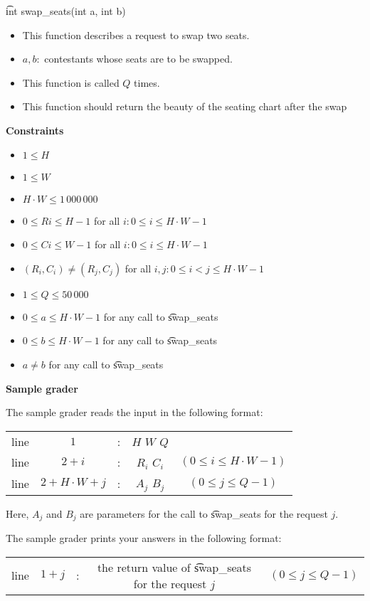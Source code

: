 \t{int swap_seats(int a, int b) }

\begin{itemize}
\item This function describes a request to swap two seats. 
\item $ a, b: $ contestants whose seats are to be swapped.
\item This function is called $ Q $ times.
\item This function should return the beauty of the seating chart after the swap 
\end{itemize}

\bf{Constraints}

\begin{itemize}
\item $ 1 \le H $ 
\item $ 1 \le W $ 
\item $ H \cdot W \le 1\,000\,000 $ 
\item $ 0 \le Ri \le H-1 $ for all $ i: 0 \le i \le H \cdot W-1 $ 
\item $ 0 \le Ci \le W-1 $ for all $ i: 0 \le i \le H \cdot W-1 $ 
\item $ (R_i, C_i) \neq (R_j, C_j) $ for all $ i, j: 0 \le i < j \le H \cdot W-1 $ 
\item $ 1 \le Q \le 50\,000 $ 
\item $ 0 \le a \le H \cdot W -1 $ for any call to \t{swap_seats}
\item $ 0 \le b \le H \cdot W -1 $ for any call to \t{swap_seats}
\item $ a \neq b $ for any call to \t{swap_seats}
\end{itemize} 

\bf{Sample grader}

The sample grader reads the input in the following format:

\begin{tabular}{ccccc}\\
line& $ 1 $ &:& $ H$ $W$ $Q$ &\\
line& $ 2+i $ &:& $R_i$ $C_i$ & $ (0 \le i \le H \cdot W-1) $ \\
line& $ 2+H \cdot W+j $ &:& $A_j$ $B_j$ & $ (0 \le j \le Q-1) $ \\
\end{tabular}

Here, $ A_j $ and $ B_j $ are parameters for the call to \t{swap_seats} for the request $j.$ 

The sample grader prints your answers in the following format:

\begin{tabular}{ccccc}
line& $ 1+j $ &:&the return value of \t{swap_seats} for the request $ j $ & $ (0 \le j \le Q-1) $ 
\end{tabular}
